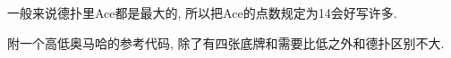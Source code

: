 一般来说德扑里Ace都是最大的, 所以把Ace的点数规定为14会好写许多.

附一个高低奥马哈的参考代码, 除了有四张底牌和需要比低之外和德扑区别不大.

\inputminted{cpp}{../src/misc/高低奥马哈.cpp}